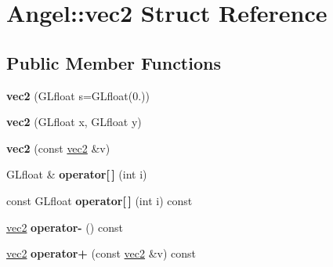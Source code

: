 \hypertarget{struct_angel_1_1vec2}{\section{\-Angel\-:\-:vec2 \-Struct \-Reference}
\label{struct_angel_1_1vec2}
}
\subsection*{\-Public \-Member \-Functions}
\begin{DoxyCompactItemize}
\item 
\hypertarget{struct_angel_1_1vec2_ab2463ddb6aaaa67251004b90f03530fa}{{\bfseries vec2} (\-G\-Lfloat s=\-G\-Lfloat(0.))}\label{struct_angel_1_1vec2_ab2463ddb6aaaa67251004b90f03530fa}

\item 
\hypertarget{struct_angel_1_1vec2_a8e55cc0bb681ca7a747721cab122d830}{{\bfseries vec2} (\-G\-Lfloat x, \-G\-Lfloat y)}\label{struct_angel_1_1vec2_a8e55cc0bb681ca7a747721cab122d830}

\item 
\hypertarget{struct_angel_1_1vec2_aa2ec5b81c4b97019486b0595db6f35a1}{{\bfseries vec2} (const \hyperlink{struct_angel_1_1vec2}{vec2} \&v)}\label{struct_angel_1_1vec2_aa2ec5b81c4b97019486b0595db6f35a1}

\item 
\hypertarget{struct_angel_1_1vec2_a48235bf48a69717c273b72468d355244}{\-G\-Lfloat \& {\bfseries operator\mbox{[}$\,$\mbox{]}} (int i)}\label{struct_angel_1_1vec2_a48235bf48a69717c273b72468d355244}

\item 
\hypertarget{struct_angel_1_1vec2_a83725a082bca8ea73a2171bb4596c1bd}{const \-G\-Lfloat {\bfseries operator\mbox{[}$\,$\mbox{]}} (int i) const }\label{struct_angel_1_1vec2_a83725a082bca8ea73a2171bb4596c1bd}

\item 
\hypertarget{struct_angel_1_1vec2_a3b29693925c8026f75572dd13cefee5a}{\hyperlink{struct_angel_1_1vec2}{vec2} {\bfseries operator-\/} () const }\label{struct_angel_1_1vec2_a3b29693925c8026f75572dd13cefee5a}

\item 
\hypertarget{struct_angel_1_1vec2_a93606208e7b65d4bb8004f498b22934f}{\hyperlink{struct_angel_1_1vec2}{vec2} {\bfseries operator+} (const \hyperlink{struct_angel_1_1vec2}{vec2} \&v) const }\label{struct_angel_1_1vec2_a93606208e7b65d4bb8004f498b22934f}


\end{DoxyCompactItemize}
